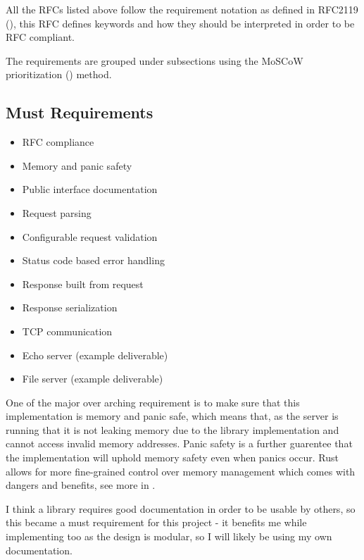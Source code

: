 \documentclass[12pt, a4paper]{article}
\begin{document}
All the RFCs listed above follow the requirement notation as defined in RFC2119 (\cite{rfc2119}),
this RFC defines keywords and how they should be interpreted in order to be RFC compliant.

The requirements are grouped under subsections using the MoSCoW prioritization (\cite{moscow}) method.

\subsection{Must Requirements}
\begin{itemize}
    \item\label{mreq:rfc-compliance} RFC compliance
    \item\label{mreq:memory-and-panic-safety} Memory and panic safety
    \item\label{mreq:public-interface-documentation} Public interface documentation
    \item\label{mreq:request-parsing} Request parsing
    \item\label{mreq:configurable-request-validation} Configurable request validation
    \item\label{mreq:status-code-based-errors} Status code based error handling
    \item\label{mreq:response-built-from-request} Response built from request
    \item\label{mreq:response-serialization} Response serialization
    \item\label{mreq:tcp-communication} TCP communication
    \item\label{mreq:example-echo-server} Echo server (example deliverable)
    \item\label{sreq:example-file-server} File server (example deliverable)
\end{itemize}

One of the major over arching requirement is to make sure that this implementation is memory and panic safe, which
means that, as the server is running that it is not leaking memory due to the library implementation
and cannot access invalid memory addresses. Panic safety is a further guarentee that the implementation
will uphold memory safety even when panics occur. Rust allows for more fine-grained control over
memory management which comes with dangers and benefits, see more in
\emph{}.

I think a library requires good documentation in order to be usable by others, so this became a must
requirement for this project - it benefits me while implementing too as the design is modular, so I
will likely be using my own documentation.
\end{document}
